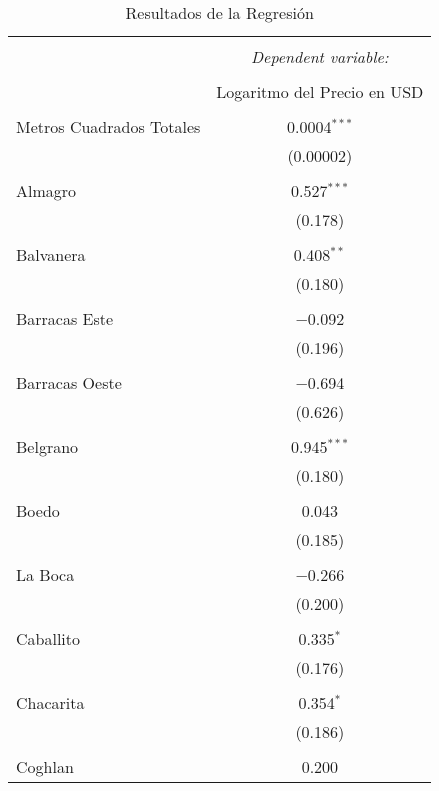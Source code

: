 
\begin{table}[!htbp] \centering 
  \caption{Resultados de la Regresión} 
  \label{tab:resultados_regresion} 
\begin{tabular}{@{\extracolsep{5pt}}lc} 
\\[-1.8ex]\hline 
\hline \\[-1.8ex] 
 & \multicolumn{1}{c}{\textit{Dependent variable:}} \\ 
\cline{2-2} 
\\[-1.8ex] & Logaritmo del Precio en USD \\ 
\hline \\[-1.8ex] 
 Metros Cuadrados Totales & 0.0004$^{***}$ \\ 
  & (0.00002) \\ 
  & \\ 
 Almagro & 0.527$^{***}$ \\ 
  & (0.178) \\ 
  & \\ 
 Balvanera & 0.408$^{**}$ \\ 
  & (0.180) \\ 
  & \\ 
 Barracas Este & $-$0.092 \\ 
  & (0.196) \\ 
  & \\ 
 Barracas Oeste & $-$0.694 \\ 
  & (0.626) \\ 
  & \\ 
 Belgrano & 0.945$^{***}$ \\ 
  & (0.180) \\ 
  & \\ 
 Boedo & 0.043 \\ 
  & (0.185) \\ 
  & \\ 
 La Boca & $-$0.266 \\ 
  & (0.200) \\ 
  & \\ 
 Caballito & 0.335$^{*}$ \\ 
  & (0.176) \\ 
  & \\ 
 Chacarita & 0.354$^{*}$ \\ 
  & (0.186) \\ 
  & \\ 
 Coghlan & 0.200 \\ 

\end{tabular}
\end{table}
